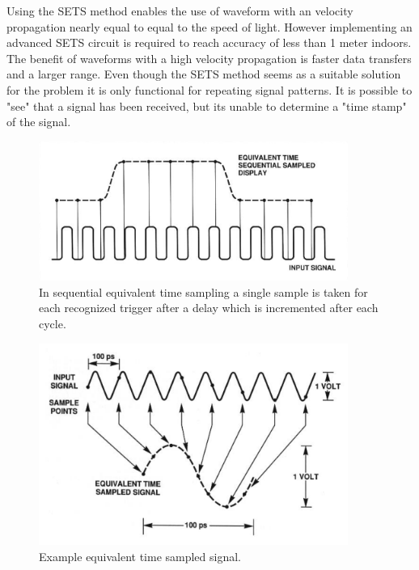 \documentclass[10pt,a4paper]{article}
\begin{document}
Using the SETS method enables the use of waveform with an velocity propagation nearly equal to equal to the speed of light. However implementing an advanced SETS circuit is required to reach accuracy of less than 1 meter indoors.\cite{TOF} The benefit of waveforms with a high velocity propagation is faster data transfers and a larger range.\cite{TOF} Even though the SETS method seems as a suitable solution for the problem it is only functional for repeating signal patterns. It is possible to "see" that a signal has been received, but its unable to determine a "time stamp" of the signal.

\begin{figure}[H]
\centering
\includegraphics[width=0.9\textwidth]{SETS.png}
\caption{In sequential equivalent time sampling a single sample is taken for each recognized trigger after a delay which is incremented after each cycle.\cite{SETS}} 
\label{SETS}
\end{figure}

\begin{figure}[H]
\centering
\includegraphics[width=0.9\textwidth]{SETS2.png}
\caption{Example equivalent time sampled signal.\cite{SETS}} 
\label{SETS2}
\end{figure}
\newpage
\end{document}
